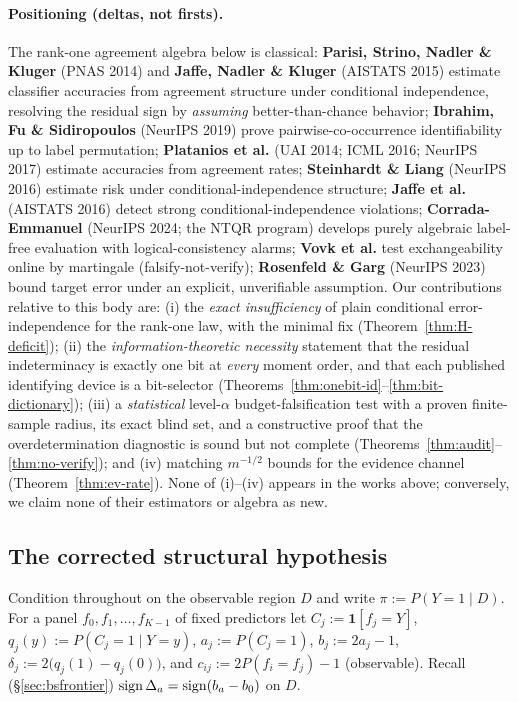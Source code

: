 \paragraph{Positioning (deltas, not firsts).} The rank-one agreement algebra below is
classical: \textbf{Parisi, Strino, Nadler \& Kluger} (PNAS 2014) and \textbf{Jaffe,
Nadler \& Kluger} (AISTATS 2015) estimate classifier accuracies from agreement structure
under conditional independence, resolving the residual sign by \emph{assuming}
better-than-chance behavior; \textbf{Ibrahim, Fu \& Sidiropoulos} (NeurIPS 2019) prove
pairwise-co-occurrence identifiability up to label permutation; \textbf{Platanios et
al.} (UAI 2014; ICML 2016; NeurIPS 2017) estimate accuracies from agreement rates;
\textbf{Steinhardt \& Liang} (NeurIPS 2016) estimate risk under conditional-independence
structure; \textbf{Jaffe et al.} (AISTATS 2016) detect strong conditional-independence
violations; \textbf{Corrada-Emmanuel} (NeurIPS 2024; the NTQR program) develops
purely algebraic label-free evaluation with logical-consistency alarms; \textbf{Vovk et
al.} test exchangeability online by martingale (falsify-not-verify); \textbf{Rosenfeld
\& Garg} (NeurIPS 2023) bound target error under an explicit, unverifiable assumption.
Our contributions relative to this body are: (i) the \emph{exact insufficiency} of plain
conditional error-independence for the rank-one law, with the minimal fix
(Theorem~\ref{thm:H-deficit}); (ii) the \emph{information-theoretic necessity} statement
that the residual indeterminacy is exactly one bit at \emph{every} moment order, and that
each published identifying device is a bit-selector (Theorems~\ref{thm:onebit-id}--\ref{thm:bit-dictionary});
(iii) a \emph{statistical} level-$\alpha$ budget-falsification test with a proven
finite-sample radius, its exact blind set, and a constructive proof that the
overdetermination diagnostic is sound but not complete
(Theorems~\ref{thm:audit}--\ref{thm:no-verify}); and (iv) matching $m^{-1/2}$ bounds for
the evidence channel (Theorem~\ref{thm:ev-rate}). None of (i)--(iv) appears in the works
above; conversely, we claim none of their estimators or algebra as new.

\subsection{The corrected structural hypothesis}\label{sec:H}

Condition throughout on the observable region $D$ and write $\pi:=P(Y{=}1\mid D)$. For a
panel $f_0,f_1,\dots,f_{K-1}$ of fixed predictors let $C_j:=\mathbf 1[f_j{=}Y]$,
$q_j(y):=P(C_j{=}1\mid Y{=}y)$, $a_j:=P(C_j{=}1)$, $b_j:=2a_j-1$,
$\delta_j:=2\big(q_j(1)-q_j(0)\big)$, and $c_{ij}:=2P(f_i{=}f_j)-1$ (observable). Recall
(\S\ref{sec:bsfrontier}) $\operatorname{sign}\Delta_a=\operatorname{sign}(b_a-b_0)$ on $D$.

